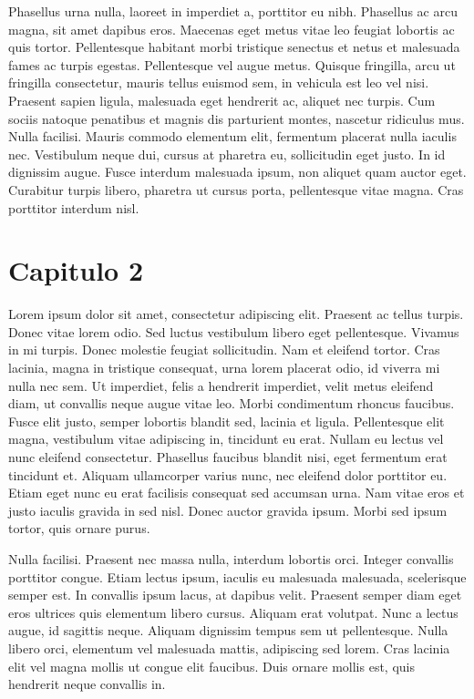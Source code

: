 \documentclass{ufbathesis}
\begin{document}
Phasellus urna nulla, laoreet in imperdiet a, porttitor eu nibh. Phasellus ac arcu magna, sit amet dapibus eros. Maecenas eget metus vitae leo feugiat lobortis ac quis tortor. Pellentesque habitant morbi tristique senectus et netus et malesuada fames ac turpis egestas. Pellentesque vel augue metus. Quisque fringilla, arcu ut fringilla consectetur, mauris tellus euismod sem, in vehicula est leo vel nisi. Praesent sapien ligula, malesuada eget hendrerit ac, aliquet nec turpis. Cum sociis natoque penatibus et magnis dis parturient montes, nascetur ridiculus mus. Nulla facilisi. Mauris commodo elementum elit, fermentum placerat nulla iaculis nec. Vestibulum neque dui, cursus at pharetra eu, sollicitudin eget justo. In id dignissim augue. Fusce interdum malesuada ipsum, non aliquet quam auctor eget. Curabitur turpis libero, pharetra ut cursus porta, pellentesque vitae magna. Cras porttitor interdum nisl.

\chapter{Capitulo 2}


Lorem ipsum dolor sit amet, consectetur adipiscing elit. Praesent ac tellus turpis. Donec vitae lorem odio. Sed luctus vestibulum libero eget pellentesque. Vivamus in mi turpis. Donec molestie feugiat sollicitudin. Nam et eleifend tortor. Cras lacinia, magna in tristique consequat, urna lorem placerat odio, id viverra mi nulla nec sem. Ut imperdiet, felis a hendrerit imperdiet, velit metus eleifend diam, ut convallis neque augue vitae leo. Morbi condimentum rhoncus faucibus. Fusce elit justo, semper lobortis blandit sed, lacinia et ligula. Pellentesque elit magna, vestibulum vitae adipiscing in, tincidunt eu erat. Nullam eu lectus vel nunc eleifend consectetur. Phasellus faucibus blandit nisi, eget fermentum erat tincidunt et. Aliquam ullamcorper varius nunc, nec eleifend dolor porttitor eu. Etiam eget nunc eu erat facilisis consequat sed accumsan urna. Nam vitae eros et justo iaculis gravida in sed nisl. Donec auctor gravida ipsum. Morbi sed ipsum tortor, quis ornare purus.

Nulla facilisi. Praesent nec massa nulla, interdum lobortis orci. Integer convallis porttitor congue. Etiam lectus ipsum, iaculis eu malesuada malesuada, scelerisque semper est. In convallis ipsum lacus, at dapibus velit. Praesent semper diam eget eros ultrices quis elementum libero cursus. Aliquam erat volutpat. Nunc a lectus augue, id sagittis neque. Aliquam dignissim tempus sem ut pellentesque. Nulla libero orci, elementum vel malesuada mattis, adipiscing sed lorem. Cras lacinia elit vel magna mollis ut congue elit faucibus. Duis ornare mollis est, quis hendrerit neque convallis in.
\end{document}

